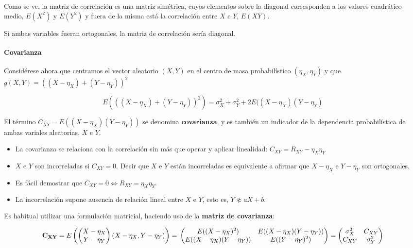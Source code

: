 \documentclass[11pt]{article}
\providecommand{\tightlist}{%
      \setlength{\itemsep}{0pt}\setlength{\parskip}{0pt}}
\begin{document}
Como se ve, la matriz de correlación es una matriz simétrica, cuyos
elementos sobre la diagonal corresponden a los valores cuadrático medio,
\(E(X^2)\) y \(E(Y^2)\) y fuera de la misma está la correlación entre
\(X\) e \(Y\), \(E(XY)\).

Si ambas variables fueran ortogonales, la matriz de correlación sería
diagonal.

    \hypertarget{covarianza}{%
\paragraph{Covarianza}\label{covarianza}}

Considérese ahora que centramos el vector aleatorio \((X,Y)\) en el
centro de masa probabilístico \((\eta_X, \eta_Y)\) y que
\(g(X,Y)=\left( (X-\eta_X)+(Y-\eta_Y) \right)^2\)

\[E\left(((X-\eta_X)+(Y-\eta_Y))^2\right)= \sigma_X^2+\sigma_Y^2+2E((X-\eta_X)(Y-\eta_Y)\]

El término \(C_{XY}=E((X-\eta_X)(Y-\eta_Y))\) se denomina
\textbf{covarianza}, y es también un indicador de la dependencia
probabilística de ambas variales aleatorias, \(X\) e \(Y\).

\begin{itemize}
\tightlist
\item
  La covarianza se relaciona con la correlación sin más que operar y
  aplicar linealidad: \(C_{XY}=R_{XY}-\eta_X\eta_Y\)
\item
  \(X\) e \(Y\) son incorreladas si \(C_{XY}=0\). Decir que \(X\) e
  \(Y\) están incorreladas es equivalente a afirmar que \(X-\eta_X\) e
  \(Y-\eta_Y\) son ortogonales.
\item
  Es fácil demostrar que \(C_{XY}= 0 \iff R_{XY}=\eta_X\eta_Y\).
\item
  La incorrelación supone ausencia de relación lineal entre \(X\) e
  \(Y\), esto es, \(Y \not \approx aX + b\).
\end{itemize}

    Es habitual utilizar una formulación matricial, haciendo uso de la
\textbf{matriz de covarianza}:

\[\mathbf{C_{XY}} = E\left(\begin{pmatrix} X-\eta_X\\Y-\eta_Y\end{pmatrix} (X-\eta_X, Y-\eta_Y)\right)=\\
\begin{pmatrix}
E((X-\eta_X)^2) & E((X-\eta_X)(Y-\eta_Y))\\
E((X-\eta_X)(Y-\eta_Y)) & E((Y-\eta_Y)^2)
\end{pmatrix}=
\begin{pmatrix}
\sigma_X^2 & C_{XY}\\
C_{XY} & \sigma_Y^2
\end{pmatrix}
\]
\end{document}
